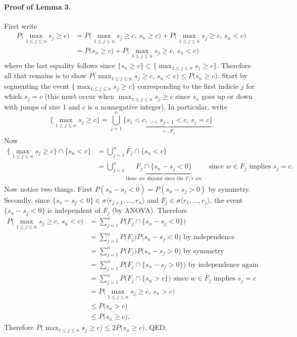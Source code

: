\documentclass[11pt,letterpaper]{article}
\begin{document}
\paragraph{Proof of Lemma 3.}
First write
\begin{align*}
P\bigl( \max_{1\leq j\leq n} s_j \geq c \bigr)&= P\bigl( \max_{1\leq j\leq n} s_j \geq c,\, s_n \geq c \bigr) + P\bigl( \max_{1\leq j\leq n} s_j \geq c,\, s_n < c  \bigr)\\
&= P\bigl( s_n \geq c \bigr) + P\bigl( \max_{1\leq j\leq n} s_j \geq c,\, s_n < c  \bigr)
\end{align*}
where the last equality follows since $\{ s_n \geq c\}\subset \{  \max_{1\leq j\leq n} s_j \geq c\}$.
Therefore all that remains is to show $ P\bigl( \max_{1\leq j\leq n} s_j \geq c,\, s_n < c  \bigr)\leq  P\bigl( s_n \geq c \bigr)$.
Start by segmenting the event $\{\max_{1\leq j\leq n} s_j \geq c\}$ corresponding to the first indicie $j$ for which $s_j= c$ (this must occur when  $ \max_{1\leq j\leq n} s_j \geq c$ since $s_n$ goes up or down with jumps of size $1$ and $c$ is a nonnegative integer). In particular, write
\[ \{  \max_{1\leq j\leq n} s_j \geq c \} =\bigcup_{j=1}^n \underbrace{\{s_1<c, \, \ldots,\, s_{j-1}<c,\, s_j= c \}}_{=:F_j} \]
Now 
\begin{align}
\{ \max_{1\leq j\leq n} s_j \geq c\}\cap\{s_n < c\} &= \bigcup_{j=1}^n F_j\cap  \{s_n < c\}\\
&= \bigcup_{j=1}^n \underbrace{F_j\cap  \{s_n - s_j<0\}}_\text{these are disjoint since the $F_j$'s are}\quad\text{since $w\in F_j$ implies $s_j=c$}.
\end{align}
Now notice two things. First $P(s_n - s_j<0)=P(s_n - s_j>0) $ by symmetry. Secondly, since $\{s_n - s_j<0 \}\in \sigma\langle r_{j+1},\ldots, r_n\rangle$ and $F_j\in \sigma\langle r_1,\ldots, r_j\rangle$, the event $\{s_n - s_j<0 \}$ is independent of $F_j$ (by ANOVA).
Therefore
\begin{align*}
P\bigl( \max_{1\leq j\leq n} s_j \geq c,\, s_n < c \bigr)&= \sum_{j=1}^n P\bigl( F_j\cap  \{s_n - s_j<0\} \bigr)\\
& = \sum_{j=1}^n P\bigl( F_j\bigr)P\bigl( s_n - s_j<0 \bigr)\text{ by independence}\\
& = \sum_{j=1}^n P\bigl( F_j\bigr)P\bigl( s_n - s_j>0 \bigr)\text{ by symmetry}\\
& = \sum_{j=1}^n P\bigl( F_j \cap \{s_n - s_j>0\} \bigr)\text{ by independence again}\\
& = \sum_{j=1}^n P\bigl( F_j \cap \{s_n > c\} \bigr)\text{ since $w\in F_j$ implies $s_j=c$}\\
&= P\bigl( \max_{1\leq j\leq n} s_j \geq c,\, s_n > c \bigr)\\
&\leq  P\bigl( s_n > c \bigr) \\
&\leq  P\bigl( s_n \geq c \bigr).
\end{align*}
Therefore $P\bigl( \max_{1\leq j\leq n} s_j \geq c \bigr)\leq 2 P\bigl( s_n \geq c \bigr)$.
QED.
\end{document}
